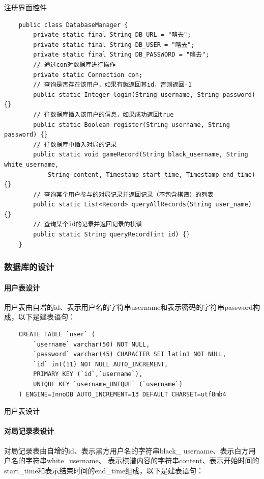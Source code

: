 \documentclass[utf8]{article}
\begin{document}
\begin{listing}[H]
    \caption{注册界面控件}
    \begin{verbatim}
    public class DatabaseManager {
        private static final String DB_URL = "略去";
        private static final String DB_USER = "略去";
        private static final String DB_PASSWORD = "略去";
        // 通过con对数据库进行操作
        private static Connection con;
        // 查询是否存在该用户，如果有就返回其id，否则返回-1
        public static Integer login(String username, String password) {}
        // 往数据库插入该用户的信息，如果成功返回true
        public static Boolean register(String username, String password) {}
        // 往数据库中插入对局的记录
        public static void gameRecord(String black_username, String white_username,
            String content, Timestamp start_time, Timestamp end_time) {}
        // 查询某个用户参与的对局记录并返回记录（不包含棋谱）的列表
        public static List<Record> queryAllRecords(String user_name) {}
        // 查询某个id的记录并返回记录的棋谱
        public static String queryRecord(int id) {}
    }
    \end{verbatim}
\end{listing}
\subsubsection{数据库的设计}
\paragraph{用户表设计}用户表由自增的id、表示用户名的字符串username和表示密码的字符串password构成，以下是建表语句：
\begin{listing}[H]
    \begin{verbatim}
    CREATE TABLE `user` (
        `username` varchar(50) NOT NULL,
        `password` varchar(45) CHARACTER SET latin1 NOT NULL,
        `id` int(11) NOT NULL AUTO_INCREMENT,
        PRIMARY KEY (`id`,`username`),
        UNIQUE KEY `username_UNIQUE` (`username`)
    ) ENGINE=InnoDB AUTO_INCREMENT=13 DEFAULT CHARSET=utf8mb4
    \end{verbatim}
    \caption{用户表设计}
\end{listing}
\paragraph{对局记录表设计}对局记录表由自增的id、表示黑方用户名的字符串black\_ username、表示白方用户名的字符串white\_username、
表示棋谱内容的字符串content、表示开始时间的start\_time和表示结束时间的end\_time组成，以下是建表语句：
\end{document}
